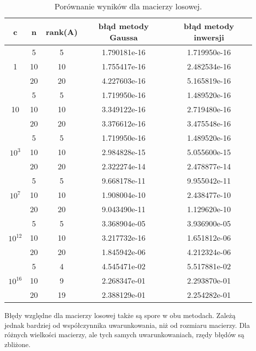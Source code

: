 \documentclass{article}
\begin{document}
\begin{table}[H]
\centering
\begin{tabular}{|c|c|c|c|c|}
\hline
	c & n & rank(A) & błąd metody Gaussa & błąd metody inwersji\\
\hline
	 & 5 & 5 & 1.790181e-16 &    1.719950e-16\\

	1 & 10 &  10 &         1.755417e-16 &    2.482534e-16\\
 & 20 &  20 &         4.227603e-16 &    5.165819e-16 \\
\hline
	& 5 & 5 & 1.719950e-16 & 1.489520e-16\\

	10 & 10 & 10 &         3.349122e-16 &    2.719480e-16 \\
& 20 & 20 &         3.376612e-16 &    3.475548e-16 \\
\hline
	 & 5 & 5 & 1.719950e-16 &    1.489520e-16\\

	$10^3$ & 10 & 10 &         2.984828e-15 &    5.055600e-15 \\
& 20 &  20 &         2.322274e-14 &    2.478877e-14 \\
\hline
 	& 5 &  5 &         9.668178e-11 &    9.955042e-11\\

	$10^7$ & 10 & 10 &         1.908004e-10 &    2.438477e-10 \\
& 20 & 20 &         9.043490e-11 &    1.129620e-10 \\
\hline
	&  5 &    5 &         3.368904e-05 &    3.936900e-05\\

	$10^{12}$ & 10 &  10 &         3.217732e-16 &    1.651812e-06 \\
& 20 &   20 &         1.845942e-06 &    4.212324e-06  \\
\hline
	& 5 &   4 &         4.545471e-02 &    5.517881e-02\\

	$10^{16}$ & 10 &    9 &         2.268347e-01 &    2.293870e-01 \\

	&  20 &   19 &         2.388129e-01 &    2.254282e-01\\
\hline

\end{tabular}
\caption{Porównanie wyników dla macierzy losowej.}
\end{table}
Błędy względne dla macierzy losowej także są spore w obu metodach. Zależą jednak bardziej od współczynnika uwarunkowania, niż od rozmiaru macierzy. Dla różnych wielkości macierzy, ale tych samych uwarunkowaniach, rzędy błędów są zbliżone. 
\end{document}
